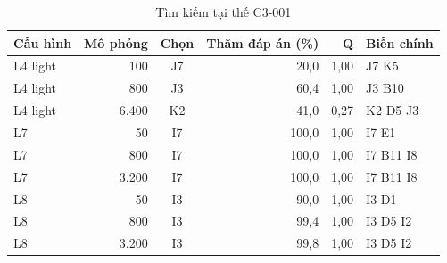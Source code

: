 \begin{table}[H]
  \centering
  \footnotesize
  \caption{Tìm kiếm tại thế C3-001}
  \label{tab:cs-tk-nhiet-c3-001}
  \begin{tabular}{lrcrrl}
    \toprule
    Cấu hình & Mô phỏng & Chọn & Thăm đáp án (\%) & Q & Biến chính \\
    \midrule
    L4 light & 100 & J7 & 20,0 & 1,00 & J7 K5 \\
    L4 light & 800 & J3 & 60,4 & 1,00 & J3 B10 \\
    L4 light & 6.400 & K2 & 41,0 & 0,27 & K2 D5 J3 \\
    L7 & 50 & I7 & 100,0 & 1,00 & I7 E1 \\
    L7 & 800 & I7 & 100,0 & 1,00 & I7 B11 I8 \\
    L7 & 3.200 & I7 & 100,0 & 1,00 & I7 B11 I8 \\
    L8 & 50 & I3 & 90,0 & 1,00 & I3 D1 \\
    L8 & 800 & I3 & 99,4 & 1,00 & I3 D5 I2 \\
    L8 & 3.200 & I3 & 99,8 & 1,00 & I3 D5 I2 \\
    \bottomrule
  \end{tabular}
\end{table}
